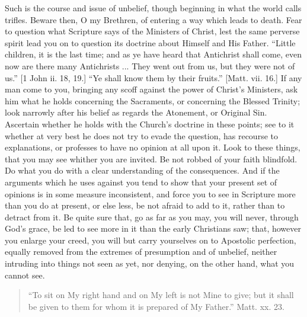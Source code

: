 Such is the course and issue of unbelief, though beginning in what
the world calls trifles. Beware then, O my Brethren, of entering a way
which leads to death. Fear to question what Scripture says of the
Ministers of Christ, lest the same perverse spirit lead you on to
question its doctrine about Himself and His Father. ``Little
children, it is the last time; and as ye have heard that Antichrist
shall come, even now are there many Antichrists ... They went out from
us, but they were not of us.'' [1 John ii. 18, 19.] ``Ye shall
know them by their fruits.'' [Matt. vii. 16.] If any man come to
you, bringing any scoff against the power of Christ's Ministers, ask him
what he holds concerning the Sacraments, or concerning the Blessed
Trinity; look narrowly after his belief as regards the Atonement, or
Original Sin. Ascertain whether he holds with the Church's doctrine in
these points; see to it whether at very best he does not try to evade
the question, has recourse to explanations, or professes to have no
opinion at all upon it. Look to these things, that you may see whither
you are invited. Be not robbed of your faith blindfold. Do what you do
with a clear understanding of the consequences. And if the arguments
which he uses against you tend to show that your present set of opinions
is in some measure inconsistent, and force you to see in Scripture more
than you do at present, or else less, be not afraid to add to it, rather
than to detract from it. Be quite sure that, go as far as you may, you
will never, through God's grace, be led to see more in it than the early
Christians saw; that, however you enlarge your creed, you will but carry
yourselves on to Apostolic perfection, equally removed from the extremes
of presumption and of unbelief, neither intruding into things not seen
as yet, nor denying, on the other hand, what you cannot see.


\begin{quote}

``To sit on My right hand and on My left is not Mine to give;
but it shall be given to them for whom it is prepared of My
Father.'' Matt. xx. 23.

\end{quote}

